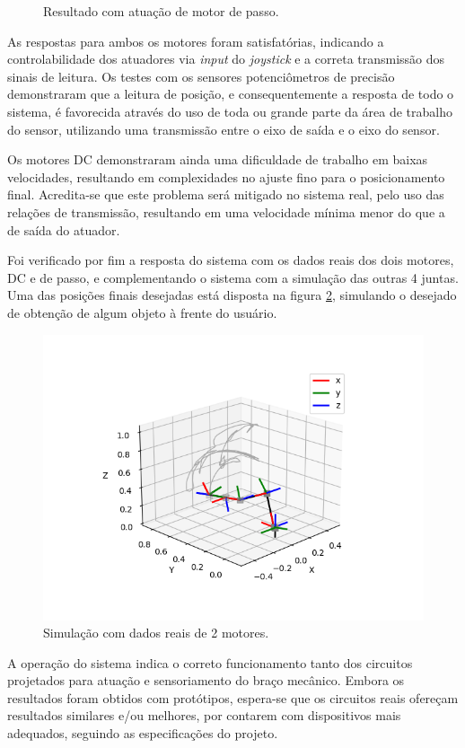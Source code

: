 \begin{figure}[h!]
\begin{centering}
\begin{floatrow}
    \end{floatrow}

\caption{Resultado com atuação de motor de passo.}
\label{fig:result-dc}

\par\end{centering}
\end{figure}

As respostas para ambos os motores foram satisfatórias, indicando a controlabilidade dos 
atuadores via \textit{input} do \textit{joystick} e a correta transmissão dos sinais de leitura. 
Os testes com os sensores potenciômetros de precisão demonstraram que a leitura de posição, 
e consequentemente a resposta de todo o sistema, é favorecida através do uso de toda ou grande
parte da área de trabalho do sensor, utilizando uma transmissão entre o eixo de saída e o eixo
do sensor. 

Os motores DC demonstraram ainda uma dificuldade de trabalho em baixas velocidades, resultando em
complexidades no ajuste fino para o posicionamento final. Acredita-se que este problema será mitigado
no sistema real, pelo uso das relações de transmissão, resultando em uma velocidade mínima menor do que 
a de saída do atuador.

Foi verificado por fim a resposta do sistema com os dados reais dos dois motores, DC e de passo, e complementando
o sistema com a simulação das outras 4 juntas. Uma das posições finais desejadas está disposta na figura 
\ref{fig:pos-dois}, simulando o desejado de obtenção de algum objeto à frente do usuário.

\begin{figure}[h!]
    \begin{centering}

    \includegraphics[width=0.8\columnwidth]{images/resultados/pos-dois.png}

\caption{Simulação com dados reais de 2 motores.}
\label{fig:pos-dois}

\par\end{centering}
\end{figure}

A operação do sistema indica o correto funcionamento tanto dos circuitos projetados para atuação e
sensoriamento do braço mecânico. Embora os resultados foram obtidos com protótipos, espera-se que 
os circuitos reais ofereçam resultados similares e/ou melhores, por contarem com dispositivos mais
adequados, seguindo as especificações do projeto.